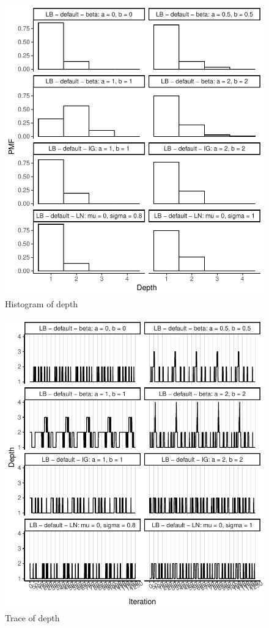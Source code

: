 \documentclass{amsart}
\begin{document}
%
\begin{figure}[ht]
	\centering
	\includegraphics[width=0.95\linewidth]{hist_depth_5.pdf}
	\caption{Histogram of depth}
	\label{fig:hist:depth:5}
\end{figure}

\begin{figure}[ht]
	\centering
	\includegraphics[width=0.95\linewidth]{trace_depth_5.pdf}
	\caption{Trace of depth}
	\label{fig:trace:depth:5}
\end{figure}
\end{document}
